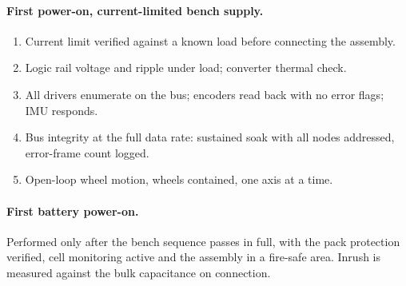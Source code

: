 \paragraph{First power-on, current-limited bench supply.}
\begin{enumerate}
  \item Current limit verified against a known load before connecting the
        assembly.
  \item Logic rail voltage and ripple under load; converter thermal check.
  \item All drivers enumerate on the bus; encoders read back with no error
        flags; IMU responds.
  \item Bus integrity at the full data rate: sustained soak with all nodes
        addressed, error-frame count logged.
  \item Open-loop wheel motion, wheels contained, one axis at a time.
\end{enumerate}

\paragraph{First battery power-on.} Performed only after the bench sequence
passes in full, with the pack protection verified, cell monitoring active and
the assembly in a fire-safe area. Inrush is measured against the bulk
capacitance on connection.

